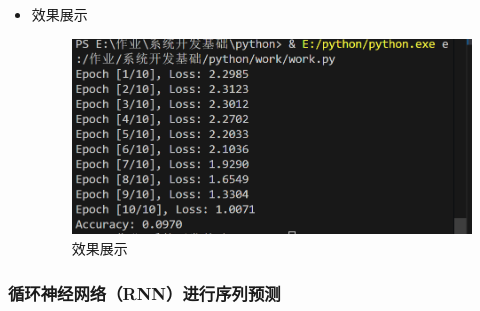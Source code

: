 \documentclass[UTF8]{ctexart}
\begin{document}
\begin{enumerate}
\begin{itemize}
\item 效果展示
  \begin{figure}[H]
    \centering
    \includegraphics[width=\textwidth]{336} %
    \caption{效果展示}
  \end{figure}
  \end{itemize}
\end{enumerate}






























\subsubsection{循环神经网络（RNN）进行序列预测}
\end{document}
